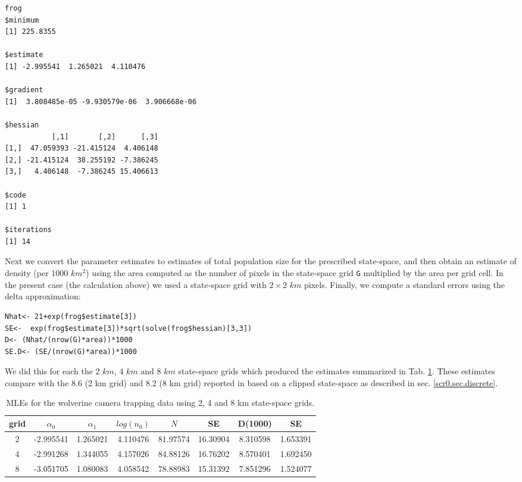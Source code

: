 {{\begin{verbatim}
frog
$minimum
[1] 225.8355

$estimate
[1] -2.995541  1.265021  4.110476

$gradient
[1]  3.808485e-05 -9.930579e-06  3.906668e-06

$hessian
           [,1]       [,2]      [,3]
[1,]  47.059393 -21.415124  4.406148
[2,] -21.415124  38.255192 -7.386245
[3,]   4.406148  -7.386245 15.406613

$code
[1] 1

$iterations
[1] 14
\end{verbatim}
}

Next we convert the parameter estimates to estimates of total
population size for the prescribed state-space, and then obtain an
estimate of density (per 1000
$km^2$) using the area computed as the number of pixels in the
state-space grid \mbox{\tt G} multiplied by the area per grid cell. In
the present case (the calculation above) we used a state-space grid
with $2 \times 2$ $km$ pixels.  Finally, we compute
a standard errors using the delta approximation: 
\begin{verbatim}
Nhat<- 21+exp(frog$estimate[3])
SE<-  exp(frog$estimate[3])*sqrt(solve(frog$hessian)[3,3])
D<- (Nhat/(nrow(G)*area))*1000
SE.D<- (SE/(nrow(G)*area))*1000
\end{verbatim}
We did this for each the 2 $km$, 4 $km$ and 8 $km$ state-space grids
which produced the estimates summarized in Tab. \ref{mle.tab.wolv}.
These estimates compare with the 8.6 (2 km grid) and 8.2 (8 km grid)
reported in 
\citet{royle_etal:2011jwm} based on a clipped state-space as described
in sec. \ref{scr0.sec.discrete}.

\begin{table}
\centering
\caption{MLEs for the wolverine camera trapping data using 2, 4 and 8 km state-space grids.}
\begin{tabular}{cccccccc}
\hline \hline
grid &  $\alpha_0$  &  $\alpha_1$ &   $log(n_0)$  & $N$   &  SE & D(1000) &  SE \\ \hline
2  &  -2.995541& 1.265021 &4.110476 &81.97574& 16.30904 &8.310598 &1.653391\\
4  &  -2.991268&1.344055  &4.157026 &84.88126& 16.76202 &8.570401& 1.692450\\
8   & -3.051705& 1.080083 &4.058542 &78.88983& 15.31392 &7.851296& 1.524077\\
\end{tabular}
\label{mle.tab.wolv}
\end{table}


}
